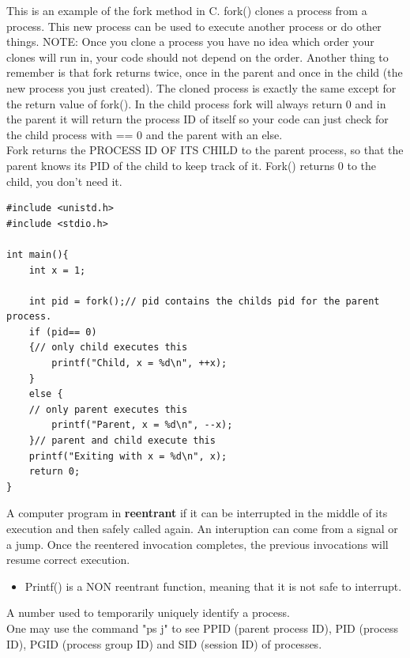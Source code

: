 \documentclass[15pt,idxtotoc,hyperref,openany]{labbook} %
\begin{document}
 \newpage
{}

This is an example of the fork method in C.  fork() clones a process from a process.  This new process can be used to execute another process or
do other things.  NOTE:  Once you clone a process you have no idea which order your clones will run in, your code should not depend on the order.  Another thing to remember is that fork returns twice, once in the parent and once in the child (the new process you just created).  The cloned process is exactly the same except for the return value of fork().  In the child process fork will always return 0 and in the parent it will return the process ID of itself so your code can just check for the child process with == 0 and the parent with an else.\\

Fork returns the PROCESS ID OF ITS CHILD to the parent process, so that the parent knows its PID of the child to keep track of it.  Fork() returns 0 to the child, you don't need it.
\begin{lstlisting}
#include <unistd.h>
#include <stdio.h>

int main(){
	int x = 1;
	
	int pid = fork();// pid contains the childs pid for the parent process.
	if (pid== 0) 
	{// only child executes this
		printf("Child, x = %d\n", ++x);
	} 
	else {
	// only parent executes this
		printf("Parent, x = %d\n", --x);
	}// parent and child execute this
	printf("Exiting with x = %d\n", x);
	return 0;
}
\end{lstlisting}

A computer program in {\bf reentrant} if it can be interrupted in the middle of its execution and then safely called again.  An interuption can come from a signal or a jump.  Once the reentered invocation completes, the previous invocations will resume correct execution.

\begin{itemize}
\item Printf() is a NON reentrant function, meaning that it is not safe to interrupt.
\end{itemize}



A number used to temporarily uniquely identify a process.\\
One may use the command "ps j" to see PPID (parent process ID), PID (process ID), PGID (process group ID) and SID (session ID) of processes.   
\end{document}
